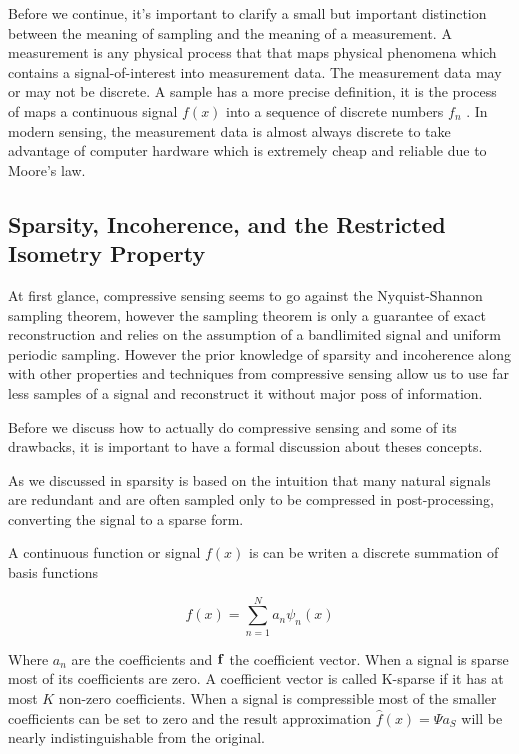Before we continue, it's important to clarify a small but important distinction between the meaning of \gls{sampling} and the meaning of a \gls{measurement}. A measurement is any physical process that that maps physical phenomena which contains a signal-of-interest into measurement data. The measurement data may or may not be discrete. A sample has a more precise definition, it is the process of maps a continuous signal $ f(x)$ into a sequence of discrete numbers $ f_n$ . In modern sensing, the measurement data is almost always discrete to take advantage of computer hardware which is extremely cheap and reliable due to Moore's law. 


\subsection{Sparsity, Incoherence, and the Restricted Isometry Property}

At first glance, compressive sensing seems to go against the Nyquist-Shannon sampling theorem, however the sampling theorem is only a guarantee of exact reconstruction and relies on the assumption of a bandlimited signal and uniform periodic sampling. However the prior knowledge of \gls{sparsity} and \gls{incoherence} along with other properties and techniques from compressive sensing allow us to use far less samples of a signal and reconstruct it without major poss of information. 

Before we discuss how to actually do compressive sensing and some of its drawbacks, it is important to have a formal discussion about theses concepts.

As we discussed in  sparsity is based on the intuition that many natural signals are redundant and are often sampled only to be compressed in post-processing, converting the signal to a sparse form. 

A continuous function or signal $f(x)$ is can be writen a discrete summation of basis functions

\begin{equation}
	f(x) = \sum_{n=1}^{N} a_n \psi_n(x)
\end{equation}

Where $a_n$ are the coefficients and $\mathbf{f}$ the coefficient vector. When a signal is sparse most of its coefficients are zero. A coefficient vector is called K-sparse if it has at most $K$ non-zero coefficients. When a signal is compressible most of the smaller coefficients can be set to zero and the result approximation $\hat{f}(x)=\Psi a_S$ will be nearly indistinguishable from the original. 

